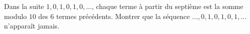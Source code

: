 Dans la suite $1, 0, 1, 0, 1, 0, \ldots$, chaque terme à partir du septième est la somme modulo $10$ des $6$ termes précédents. Montrer que la séquence $\ldots, 0, 1, 0, 1, 0, 1, \ldots$ n'apparaît jamais.
